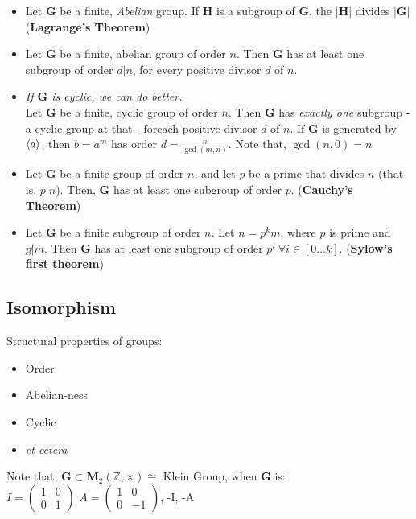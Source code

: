 \documentclass{article}
\begin{document}
  \begin{itemize}
    \item
      Let $\mathbf{G}$ be a finite, \emph{Abelian} group. If $\mathbf{H}$ is a
      subgroup of $\mathbf{G}$, the $|\mathbf{H}|$ divides $|\mathbf{G}|$
      ({\bf Lagrange's Theorem})

    \item
      Let $\mathbf{G}$ be a finite, abelian group of order $n$.
      Then $\mathbf{G}$ has at least one subgroup of order $d | n$, for every
      positive divisor $d$ of $n$. 

    \item
      \emph{If $\mathbf{G}$ is cyclic, we can do better.}\\
      Let $\mathbf{G}$ be a finite, cyclic group of order $n$. Then $\mathbf{G}$
      has \emph{exactly one} subgroup - a cyclic group at that - foreach
      positive divisor $d$ of $n$. If $\mathbf{G}$ is generated by $\langle a \rangle$,
      then $b = a^m$ has order $d = \frac{n}{\gcd(m, n)}$.
      Note that, $\gcd(n, 0) = n$

    \item
      Let $\mathbf{G}$ be a finite group of order $n$, and let $p$ be a prime
      that divides $n$ (that is, $p | n$).  Then, $\mathbf{G}$ has at least one
      subgroup of order $p$. ({\bf Cauchy's Theorem})

    \item
      Let $\mathbf{G}$ be a finite subgroup of order $n$. Let $n = p^k m$, where
      $p$ is prime and $p\not | m$. Then $\mathbf{G}$ has at least one subgroup
      of order $p^i \ \forall i \in [0 \dots k]$. ({\bf Sylow's first theorem})
  \end{itemize}


  \subsection{Isomorphism}

  Structural properties of groups:
  \begin{itemize}
    \item Order
    \item Abelian-ness
    \item Cyclic
    \item \emph{et cetera}
  \end{itemize}

  Note that, $\mathbf{G} \subset \mathbf{M}_2(\mathbb{Z}, \times) \cong$ Klein Group, when $\mathbf{G}$ is:\\
  $I = \begin{pmatrix}
    1 & 0 \\
    0 & 1
  \end{pmatrix}$
  $A = \begin{pmatrix}
    1 & 0 \\
    0 & -1
  \end{pmatrix}$, -I, -A
\end{document}
